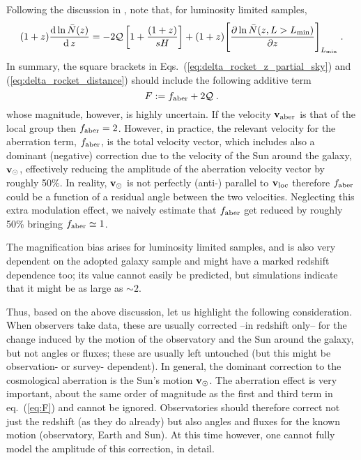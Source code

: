 \documentclass[a4paper,11pt]{article}
\renewcommand{\d}{\operatorname{d}}
\begin{document}
Following the discussion in \cite{Bertacca:2014hwa},  note that, for luminosity limited samples, 
\[
(1+z)\frac{\d \ln\bar N(z)}{\d z} = -2\mathcal{Q} \left[1+\frac{(1+ {z})}{s H}\right] +  (1+z)
\Bigg[\frac{\partial \ln\bar N(z, L>L_{\rm min})}
{\partial z}\Bigg]_{L_{\rm min}}\;.
\]
In summary, the square brackets in
{Eqs.~(\ref{eq:delta_rocket_z_partial_sky}) and  (\ref{eq:delta_rocket_distance})} should include the following additive term
\begin{equation}
    F:= f_{\rm aber}   + 2\mathcal{Q} \;.
    \label{eq:F}
\end{equation}
whose magnitude, however, is highly uncertain.
  If the velocity ${\bf v}_{\rm aber}$ is that of the local group then $f_{\rm aber}= 2$. However, in practice, the relevant velocity for the aberration term, $f_{\rm aber}$, is the total velocity vector, which includes also  a dominant (negative) correction due to the velocity of the Sun around the galaxy, ${\bf v}_\odot$, effectively reducing the amplitude of the aberration velocity vector by roughly 50\%. In reality, ${\bf v}_\odot$ is not perfectly  (anti-) parallel to ${\bf v}_{\rm loc}$ therefore $f_{\rm aber}$ could be a function of a residual angle between the two velocities. 
Neglecting this  extra modulation effect, we naively estimate that   $f_{\rm aber}$ get reduced by roughly 50\% bringing $f_{\rm aber} \simeq 1$.

The magnification bias arises for luminosity limited samples, and is also very dependent on the adopted galaxy sample and might have a marked redshift dependence too; its value cannot easily be predicted, but simulations indicate that it might be as large as $\sim 2$. 

Thus, based on the above discussion, let us highlight the following  consideration.
 When observers take data, these are  usually  corrected  --in redshift only-- for the change  induced  by the motion of the observatory and the Sun around the galaxy, but not angles or fluxes; these are usually  left untouched (but this might be observation- or survey- dependent). In general,  the dominant correction to the cosmological aberration is the Sun’s motion ${\bf v}_{\odot}$. The aberration effect is very important, about the same order of magnitude as the first and third term in eq.~(\ref{eq:F})  and cannot be ignored.  Observatories should therefore  correct not just the redshift  (as they do already) but also angles and fluxes  for the known motion (observatory, Earth and Sun). At this time however, one cannot fully model  the amplitude of this correction, in detail.
 
\end{document}
